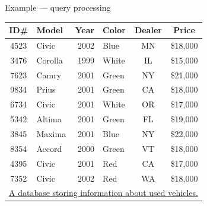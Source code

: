 \documentclass[10pt, t]{beamer}
\begin{document}
  \begin{frame}{Example --- query processing}
    \begin{center}
      \small
      \begin{tabular}{clrlcc}
        \hline
        ID\# & Model   & Year & Color & Dealer & Price \\
        \hline
        4523 & Civic   & 2002 & Blue  & MN     & \$18,000 \\
        3476 & Corolla & 1999 & White & IL     & \$15,000 \\
        7623 & Camry   & 2001 & Green & NY     & \$21,000 \\
        9834 & Prius   & 2001 & Green & CA     & \$18,000 \\
        6734 & Civic   & 2001 & White & OR     & \$17,000 \\
        5342 & Altima  & 2001 & Green & FL     & \$19,000 \\
        3845 & Maxima  & 2001 & Blue  & NY     & \$22,000 \\
        8354 & Accord  & 2000 & Green & VT     & \$18,000 \\
        4395 & Civic   & 2001 & Red   & CA     & \$17,000 \\
        7352 & Civic   & 2002 & Red   & WA     & \$18,000 \\
        \hline
        \multicolumn{6}{r}{\tiny{\href{https://www.pearson.com/us/higher-education/program/Grama-Introduction-to-Parallel-Computing-2nd-Edition/PGM11645.html}{A database storing information about used vehicles.}}}
      \end{tabular}
    \end{center}

    \small

  \end{frame}
\end{document}
